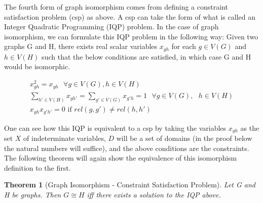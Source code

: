 \documentclass[12pt]{article}
\newtheorem{thm}{Theorem}[section]
\begin{document}
The fourth form of graph isomorphism comes from defining a constraint
satisfaction problem (csp) as above. A csp can take the form of what
is called an Integer Quadratic Programming (IQP) problem. In the case
of graph isomorphism, we can formulate this IQP problem in the
following way: Given two graphs G and H, there exists real scalar
variables $x_{gh}$ for each $g \in V(G)$ and $h \in V(H)$ such that
the below conditions are satisfied, in which case G and H would be
isomorphic.

\begin{subequations}
\label{IQP}
\begin{align}
x_{gh}^2 = x_{gh} \text{ } \forall g \in V(G), h \in V(H) \\ \sum_{h'
  \in V(H)} x_{gh'} = \sum_{g' \in V(G)} x_{g'h} = 1 \text{ } \forall
g \in V(G), \text{ } h \in V(H) \\ x_{gh}x_{g'h'} = 0 \text{ if }
rel(g, g') \neq rel(h, h')
\end{align}
\end{subequations}

One can see how this IQP is equivalent to a csp by taking the
variables $x_{gh}$ as the set $X$ of indeterminate variables, $D$ will
be a set of domains (in the proof below the natural numbers will
suffice), and the above conditions are the constraints. The following
theorem will again show the equivalence of this isomorphism definition
to the first.

\begin{thm}[Graph Isomorphism - Constraint Satisfaction Problem]
  Let G and H be graphs. Then $G \cong H$ iff there exists a solution
  to the IQP above.
\end{thm}
\end{document}

